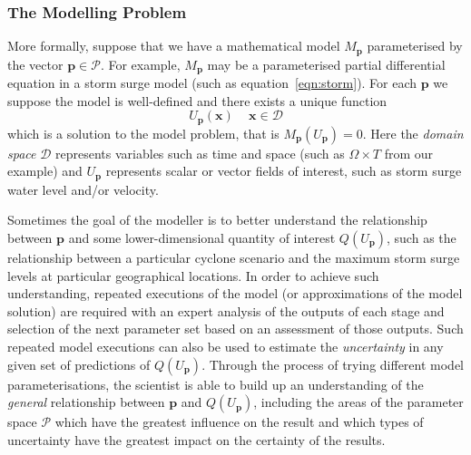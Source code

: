\subsubsection*{The Modelling Problem}

More formally, suppose that we have a mathematical model
$M_{\mathbf{p}}$ parameterised by the vector
$\mathbf{p}\in\mathcal{P}$. For example, $M_{\mathbf{p}}$ may be a
parameterised partial differential equation %
in a storm surge model (such as equation~\eqref{eqn:storm}).
For each $\mathbf{p}$ we suppose the model is
well-defined and there exists a unique function
\begin{equation}
  \label{eq:1}
  U_{\mathbf{p}}(\mathbf{x})\, \quad \mathbf{x}\in\mathcal{D}
\end{equation}
which is a solution to the model problem, that is $M_{\mathbf{p}}(U_{\mathbf{p}})=0$.
Here the \emph{domain space} $\mathcal{D}$ represents variables such as 
time and space (such as $\Omega \times T$ from our example) 
and $U_{\mathbf{p}}$ represents scalar or vector fields of interest, 
such as storm surge water level and/or velocity. 

Sometimes the goal of the modeller is to better understand the
relationship between $\mathbf{p}$ and some lower-dimensional quantity
of interest $Q(U_{\mathbf{p}})$, such as the relationship between a
particular cyclone scenario and the maximum storm surge levels at
particular geographical locations. In order to achieve such
understanding, repeated executions of the model (or approximations of the model solution) are required
with an expert analysis of the outputs of each stage and selection of
the next parameter set based on an assessment of those outputs. Such
repeated model executions can also be used to estimate the
\emph{uncertainty} in any given set of predictions of
$Q(U_{\mathbf{p}})$. Through the process of trying different model
parameterisations, the scientist is able to build up an understanding
of the \emph{general} relationship between $\mathbf{p}$ and
$Q(U_{\mathbf{p}})$, including the areas of the parameter space
$\mathcal{P}$ which have the greatest influence on the result and
which types of uncertainty have the greatest impact on the certainty
of the results.






